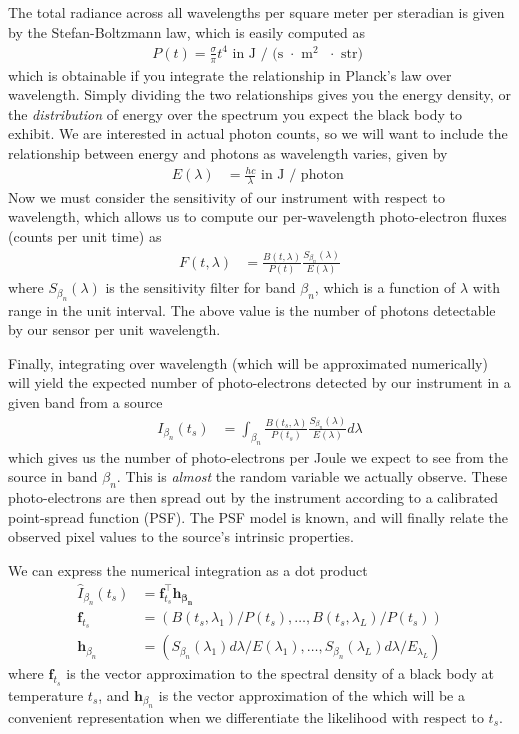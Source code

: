 \documentclass[11pt]{article}
\newcommand{\trans}{\intercal}
\begin{document}
The total radiance across all wavelengths per square meter per steradian is given by the Stefan-Boltzmann law, which is easily computed as 
\begin{align}
  P(t) = \frac{\sigma}{\pi} t^4 \text{  in J / (s $\cdot$ m$^2$ $\cdot$ str) } 
\end{align}
which is obtainable if you integrate the relationship in Planck's law over wavelength.  Simply dividing the two relationships gives you the energy density, or the \emph{distribution} of energy over the spectrum you expect the black body to exhibit.  We are interested in actual photon counts, so we will want to include the relationship between energy and photons as wavelength varies, given by 
\begin{align}
  E(\lambda) &= \frac{h c}{\lambda} \text{ in J / photon }
\end{align}
Now we must consider the sensitivity of our instrument with respect to wavelength, which allows us to compute our per-wavelength photo-electron fluxes (counts per unit time) as 
\begin{align}
  F(t, \lambda) &= \frac{B(t, \lambda)}{P(t)} \frac{S_{\beta_n}(\lambda)}{E(\lambda)} 
\end{align}
where $S_{\beta_n}(\lambda)$ is the sensitivity filter for band $\beta_n$, which is a function of $\lambda$ with range in the unit interval.  The above value is the number of photons detectable by our sensor per unit wavelength.  

Finally, integrating over wavelength (which will be approximated numerically) will yield the expected number of photo-electrons detected by our instrument in a given band from a source 
\begin{align}
  I_{\beta_n}(t_s) &= \int_{\beta_n} \frac{B(t_s, \lambda)}{P(t_s)} \frac{S_{\beta_n}(\lambda)}{ E(\lambda)} d\lambda
  \label{eq:photojoules}
\end{align}
which gives us the number of photo-electrons per Joule we expect to see from the source in band $\beta_n$.  This is \emph{almost} the random variable we actually observe.  These photo-electrons are then spread out by the instrument according to a calibrated point-spread function (PSF).  The PSF model is known, and will finally relate the observed pixel values to the source's intrinsic properties. 

We can express the numerical integration as a dot product
\begin{align}
  \hat I_{\beta_n}(t_s) &= \mathbf{f}_{t_s}^\trans \mathbf{h_{\beta_n}} \\
  \mathbf{f}_{t_s}     &= (B(t_s, \lambda_1)/P(t_s), \dots, B(t_s, \lambda_L)/P(t_s)) \\ 
  \mathbf{h}_{\beta_n} &= (S_{\beta_n}(\lambda_1)d\lambda / E(\lambda_1), \dots, S_{\beta_n}(\lambda_L)d\lambda / E_{\lambda_L}) 
\end{align}
where $\mathbf{f}_{t_s}$ is the vector approximation to the spectral density of a black body at temperature $t_s$, and $\mathbf{h}_{\beta_n}$ is the vector approximation of the 
which will be a convenient representation when we differentiate the likelihood with respect to $t_s$.  
\end{document}
